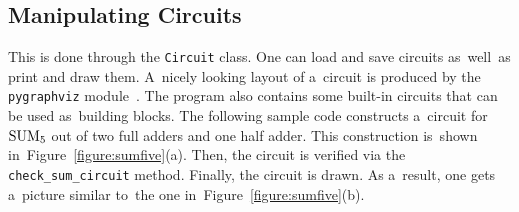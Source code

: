 \subsection{Manipulating Circuits}
This is done through the \texttt{Circuit}
class. One can load and save circuits as~well~as
print and draw them. A~nicely looking layout of
a~circuit is produced by the \texttt{pygraphviz} module~\cite{pygraphviz}. The program also contains some built-in
circuits that can be used as~building blocks.
The following sample code constructs a~circuit
for $\operatorname{SUM}_5$ out of two full adders and
one half adder. This construction is~shown
in~Figure~\ref{figure:sumfive}(a). Then,
the circuit is verified via the
\texttt{check_sum_circuit} method.
Finally, the circuit is drawn. As a~result, one gets
a~picture similar to~the one in~Figure~\ref{figure:sumfive}(b).

\inputminted[firstline=40,lastline=47]{python}{../tutorial.py}

